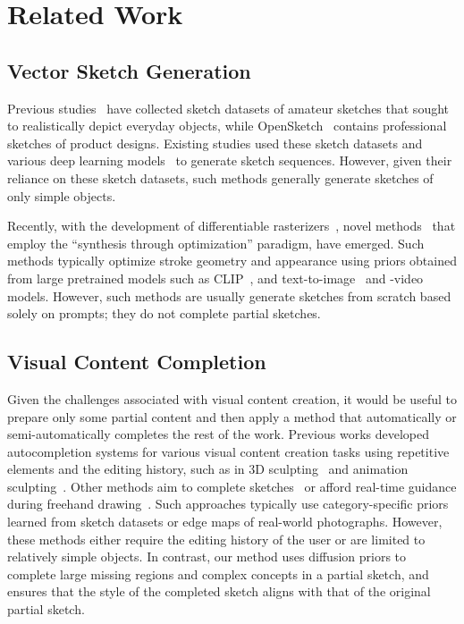 \section{Related Work}
\label{sec:related}
\subsection{Vector Sketch Generation}
Previous studies~\cite{eitz2012hdhso,ha2017neural,sketchy2016} have collected sketch datasets of amateur sketches that sought to realistically depict everyday objects, while OpenSketch~\cite{gryaditskaya2019opensketch} contains professional sketches of product designs.
Existing studies used these sketch datasets and various deep learning models~\cite{ha2017neural,lin2020sketch,ribeiro2020sketchformer,zhou2018learning} to generate sketch sequences.
However, given their reliance on these sketch datasets, such methods generally generate sketches of only simple objects.

Recently, with the development of differentiable rasterizers~\cite{Li:2020:DVG}, novel methods~\cite{vinker2022clipasso,vinker2023clipascene, xing2023diffsketcher,sketchVideo24} that employ the ``synthesis through optimization'' paradigm, have emerged.
Such methods typically optimize stroke geometry and appearance using priors obtained from large pretrained models such as CLIP~\cite{radford2021learning}, and text-to-image~\cite{rombach2022high} and -video~\cite{wang2023modelscope} models.
However, such methods are usually generate sketches from scratch based solely on prompts; they do not complete partial sketches.

\subsection{Visual Content Completion}
Given the challenges associated with visual content creation, it would be useful to prepare only some partial content and then apply a method that automatically or semi-automatically completes the rest of the work.
Previous works developed autocompletion systems for various visual content creation tasks using repetitive elements and the editing history, such as in 3D sculpting~\cite{peng2018autocomplete} and animation sculpting~\cite{peng2020autocomplete}.
Other methods aim to complete sketches~\cite{liu2019sketchgan} or afford real-time guidance during freehand drawing~\cite{lee2011shadowdraw}.
Such approaches typically use category-specific priors learned from sketch datasets or edge maps of real-world photographs.
However, these methods either require the editing history of the user or are limited to relatively simple objects.
In contrast, our method uses diffusion priors to complete large missing regions and complex concepts in a partial sketch, and ensures that the style of the completed sketch aligns with that of the original partial sketch.



